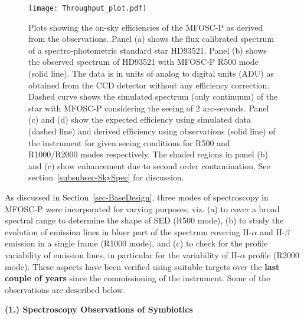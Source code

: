 \begin{figure*}
	\centering
	\texttt{[image: Throughput\_plot.pdf]}
	\vspace{0.2cm}
	\caption{Plots showing the on-sky efficiencies of the MFOSC-P as derived from the observations. Panel (a) shows the flux calibrated spectrum of a spectro-photometric standard star HD93521. Panel (b) shows the observed spectrum of HD93521 with MFOSC-P R500 mode (solid line). The data is in units of analog to digital units (ADU) as obtained from the CCD detector without any efficiency correction. Dashed curve shows the simulated spectrum (only continuum) of the star with MFOSC-P considering the seeing of 2 arc-seconds.  Panel (c) and (d) show the expected efficiency using simulated data (dashed line) and derived efficiency using observations (solid line) of the instrument for given seeing conditions for R500 and R1000/R2000 modes respectively. The shaded regions in panel (b) and (c) show enhancement due to second order contamination. See section~\ref{subsubsec-SkySpec} for discussion.}
	\label{fig-OnSkyThroughput}
\end{figure*}

\par 
As discussed in Section~\ref{sec-BaseDesign}, three modes of spectroscopy in MFOSC-P were incorporated for varying purposes, viz.  (a) to cover a broad spectral range to determine the shape of SED (R500 mode), (b) to study the evolution of emission lines in bluer part of the spectrum covering H-$\alpha$ and H-$\beta$ emission in a single frame (R1000 mode), and (c) to check for the profile variability of emission lines, in particular for the variability of H-$\alpha$ profile (R2000 mode). These aspects have been verified using suitable targets over the {\bf last couple of years} since the commissioning of the instrument. Some of the observations are described below.\\

\par 
{\bf (1.) Spectroscopy Observations of Symbiotics} \\
\par 

